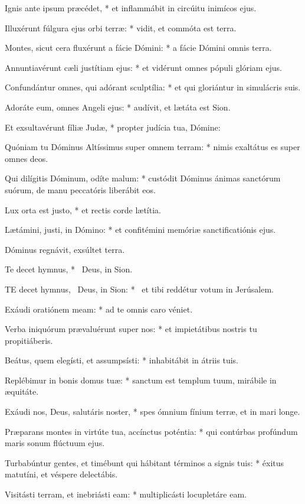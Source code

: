 Ignis ante ipsum præcédet, * et inflammábit in circúitu inimícos ejus.

Illuxérunt fúlgura ejus orbi terræ: * vidit, et commóta est terra.

Montes, sicut cera fluxérunt a fácie Dómini: * a fácie Dómini omnis terra.

Annuntiavérunt cæli justítiam ejus: * et vidérunt omnes pópuli glóriam ejus.

Confundántur omnes, qui adórant sculptília: * et qui gloriántur in simulácris suis.

Adoráte eum, omnes Angeli ejus: * audívit, et lætáta est Sion.

Et exsultavérunt fíliæ Judæ, * propter judícia tua, Dómine:

Quóniam tu Dóminus Altíssimus super omnem terram: * nimis exaltátus es super omnes deos.

Qui dilígitis Dóminum, odíte malum: * custódit Dóminus ánimas sanctórum suórum, de manu peccatóris liberábit eos.

Lux orta est justo, * et rectis corde lætítia.

Lætámini, justi, in Dómino: * et confitémini memóriæ sanctificatiónis ejus.

 Dóminus regnávit, exsúltet terra.

 Te decet hymnus, * \textdagger\ Deus, in Sion. \textdaggerdbl


\lettrine[lines=2]{T}{E} decet hymnus, \textdagger\ Deus, in Sion: * \textdaggerdbl\ et tibi reddétur votum in Jerúsalem.

Exáudi oratiónem meam: * ad te omnis caro véniet.

Verba iniquórum prævaluérunt super nos: * et impietátibus nostris tu propitiáberis.

Beátus, quem elegísti, et assumpsísti: * inhabitábit in átriis tuis.

Replébimur in bonis domus tuæ: * sanctum est templum tuum, mirábile in æquitáte.

Exáudi nos, Deus, salutáris noster, * spes ómnium fínium terræ, et in mari longe.

Præparans montes in virtúte tua, accínctus poténtia: * qui contúrbas profúndum maris sonum flúctuum ejus.

Turbabúntur gentes, et timébunt qui hábitant términos a signis tuis: * éxitus matutíni, et véspere delectábis.

Visitásti terram, et inebriásti eam: * multiplicásti locupletáre eam.

